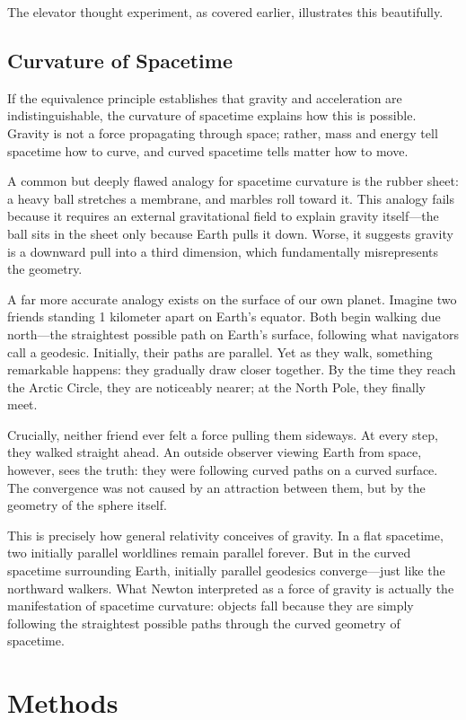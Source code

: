 \documentclass[12pt, a4paper]{article}
\begin{document}
	The elevator thought experiment, as covered earlier, illustrates this beautifully.
	
	\subsection{Curvature of Spacetime}
	If the equivalence principle establishes that gravity and acceleration are indistinguishable, the curvature of spacetime explains how this is possible. Gravity is not a force propagating through space; rather, mass and energy tell spacetime how to curve, and curved spacetime tells matter how to move.
	
	A common but deeply flawed analogy for spacetime curvature is the rubber sheet: a heavy ball stretches a membrane, and marbles roll toward it. This analogy fails because it requires an external gravitational field to explain gravity itself—the ball sits in the sheet only because Earth pulls it down. Worse, it suggests gravity is a downward pull into a third dimension, which fundamentally misrepresents the geometry.
	
	A far more accurate analogy exists on the surface of our own planet. Imagine two friends standing 1 kilometer apart on Earth's equator. Both begin walking due north—the straightest possible path on Earth's surface, following what navigators call a geodesic. Initially, their paths are parallel. Yet as they walk, something remarkable happens: they gradually draw closer together. By the time they reach the Arctic Circle, they are noticeably nearer; at the North Pole, they finally meet.
	
	Crucially, neither friend ever felt a force pulling them sideways. At every step, they walked straight ahead. An outside observer viewing Earth from space, however, sees the truth: they were following curved paths on a curved surface. The convergence was not caused by an attraction between them, but by the geometry of the sphere itself.
	
	This is precisely how general relativity conceives of gravity. In a flat spacetime, two initially parallel worldlines remain parallel forever. But in the curved spacetime surrounding Earth, initially parallel geodesics converge—just like the northward walkers. What Newton interpreted as a force of gravity is actually the manifestation of spacetime curvature: objects fall because they are simply following the straightest possible paths through the curved geometry of spacetime.
	
	\section{Methods}
\end{document}
